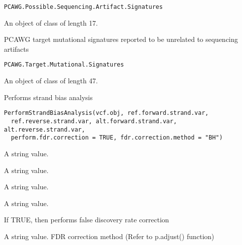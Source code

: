 \documentclass[letterpaper]{book}
\begin{document}
%
\begin{Usage}
\begin{verbatim}
PCAWG.Possible.Sequencing.Artifact.Signatures
\end{verbatim}
\end{Usage}
%
\begin{Format}
An object of class  of length 17.
\end{Format}
%
\begin{Description}\relax
PCAWG target mutational signatures reported to be unrelated to sequencing artifacts
\end{Description}
%
\begin{Usage}
\begin{verbatim}
PCAWG.Target.Mutational.Signatures
\end{verbatim}
\end{Usage}
%
\begin{Format}
An object of class  of length 47.
\end{Format}
%
\begin{Description}\relax
Performs strand bias analysis
\end{Description}
%
\begin{Usage}
\begin{verbatim}
PerformStrandBiasAnalysis(vcf.obj, ref.forward.strand.var,
  ref.reverse.strand.var, alt.forward.strand.var, alt.reverse.strand.var,
  perform.fdr.correction = TRUE, fdr.correction.method = "BH")
\end{verbatim}
\end{Usage}
%
\begin{Arguments}
\begin{ldescription}
\item[\code{vcf.obj}] 

\item[\code{ref.forward.strand.var}] A string value.

\item[\code{ref.reverse.strand.var}] A string value.

\item[\code{alt.forward.strand.var}] A string value.

\item[\code{alt.reverse.strand.var}] A string value.

\item[\code{perform.fdr.correction}] If TRUE, then performs false discovery rate correction

\item[\code{fdr.correction.method}] A string value. FDR correction method (Refer to p.adjust() function)
\end{ldescription}
\end{Arguments}
\end{document}

